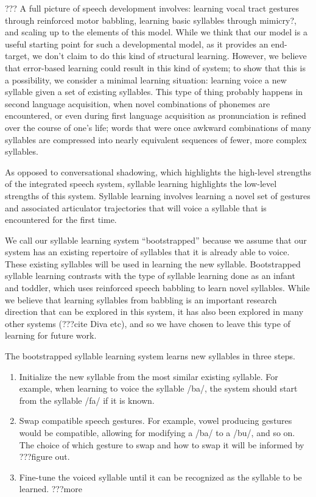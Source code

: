 ??? A full picture of speech development involves:
learning vocal tract gestures
through reinforced motor babbling,
learning basic syllables
through mimicry?,
and scaling up to the elements of this model.
While we think that our model
is a useful starting point for such
a developmental model,
as it provides an end-target,
we don't claim to do this kind of structural learning.
However, we believe that error-based learning
could result in this kind of system;
to show that this is a possibility,
we consider a minimal learning situation:
learning voice a new syllable
given a set of existing syllables.
This type of thing probably happens
in second language acquisition,
when novel combinations of phonemes
are encountered,
or even during first language acquisition
as pronunciation is refined over
the course of one's life;
words that were once awkward combinations
of many syllables are compressed into
nearly equivalent sequences of fewer,
more complex syllables.

As opposed to conversational shadowing,
which highlights the high-level strengths
of the integrated speech system,
syllable learning highlights
the low-level strengths of this system.
Syllable learning involves
learning a novel set of gestures
and associated articulator trajectories
that will voice a syllable
that is encountered for the first time.

We call our syllable learning system ``bootstrapped''
because we assume that our system
has an existing repertoire of syllables
that it is already able to voice.
These existing syllables will be
used in learning the new syllable.
Bootstrapped syllable learning contrasts with
the type of syllable learning
done as an infant and toddler,
which uses reinforced speech babbling
to learn novel syllables.
While we believe that learning syllables
from babbling is an important research direction
that can be explored in this system,
it has also been explored in many other systems
(???cite Diva etc),
and so we have chosen to leave this type of learning
for future work.

The bootstrapped syllable learning system
learns new syllables in three steps.

\begin{enumerate}
\item Initialize the new syllable from the most
  similar existing syllable.
  For example, when learning to voice
  the syllable /ba/, the system should
  start from the syllable /fa/ if it is known.
\item Swap compatible speech gestures.
  For example, vowel producing gestures
  would be compatible, allowing for modifying
  a /ba/ to a /bu/, and so on.
  The choice of which gesture to swap and
  how to swap it will be informed by
  ???figure out.
\item Fine-tune the voiced syllable
  until it can be recognized as the
  syllable to be learned.
  ???more
\end{enumerate}

